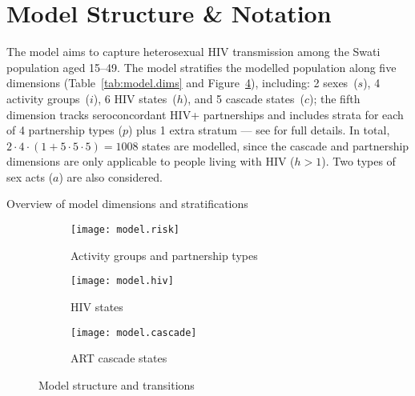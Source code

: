 \section{Model Structure \& Notation}\label{mod.str}
The model aims to capture heterosexual HIV transmission among the Swati population aged 15--49.
The model stratifies the modelled population along five dimensions
(Table~\ref{tab:model.dims} and Figure~\ref{fig:model}), including:
2 sexes~($s$), 4 activity groups~($i$), 6 HIV states~($h$), and 5 cascade states~($c$);
the fifth dimension tracks seroconcordant HIV+ partnerships
and includes strata for each of 4 partnership types ($p$) plus 1 extra stratum
--- see  for full details.
In total, $2 \cdot 4 \cdot (1 + 5 \cdot 5 \cdot 5) = 1008$ states are modelled,
since the cascade and partnership dimensions are only applicable to people living with HIV ($h>1$).
Two types of sex acts ($a$) are also considered.
\begin{table}[h]
  \centering
  \caption{Overview of model dimensions and stratifications}
  \label{tab:model.dims}
  
\end{table}
\begin{figure}[h]
  \begin{subfigure}{\linewidth}
    \texttt{[image: model.risk]}
    \caption{Activity groups and partnership types}
    \label{fig:model.risk}
  \end{subfigure}
  \begin{subfigure}{\linewidth}
    \texttt{[image: model.hiv]}
    \caption{HIV states}
    \label{fig:model.hiv}
  \end{subfigure}
  \begin{subfigure}{\linewidth}
    \texttt{[image: model.cascade]}
    \caption{ART cascade states}
    \label{fig:model.cascade}
  \end{subfigure}
  \caption{Model structure and transitions}
  \label{fig:model}
\end{figure}
